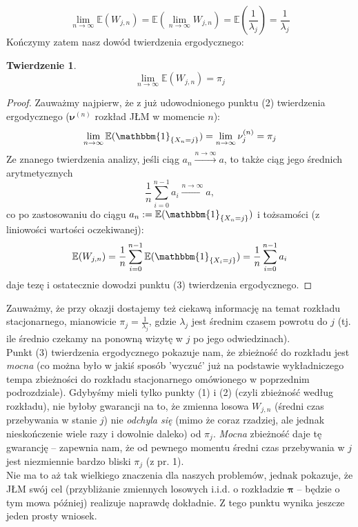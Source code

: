 \documentclass[a4paper]{article}
\theoremstyle{defn}
\theoremstyle{theorem}
\newtheorem{theorem}[defn]{Twierdzenie}
\theoremstyle{lemma}
\theoremstyle{cor}
\theoremstyle{fact}
\begin{document}
$$\lim\limits_{n \to \infty} \mathbb{E}(W_{j,n}) = \mathbb{E}\left( \lim\limits_{n \to \infty} W_{j,n}\right) = \mathbb{E}\left(\frac{1}{\lambda_j}\right) = \frac{1}{\lambda_j}$$
Kończymy zatem nasz dowód twierdzenia ergodycznego:
\begin{theorem}\label{theorem2.5.13}
$$\lim\limits_{n \to \infty} \mathbb{E}(W_{j,n}) = \pi_j$$
\end{theorem}
\begin{proof}
Zauważmy najpierw, że z już udowodnionego punktu (2) twierdzenia ergodycznego ($\boldsymbol{\nu}^{(n)}$ rozkład JŁM w momencie $n$):
$$\lim\limits_{n \to \infty} \mathbb{E}(\mathbbm{1}_{\{X_n = j\}}) = \lim\limits_{n \to \infty} \nu^{(n)}_j = \pi_j$$
Ze znanego twierdzenia analizy, jeśli ciąg $a_n \xrightarrow{n \to \infty} a$, to także ciąg jego średnich arytmetycznych $$\frac{1}{n}\sum_{i=0}^{n-1} a_i \xrightarrow{n \to \infty} a,$$
co po zastosowaniu do ciągu $a_n := \mathbb{E}(\mathbbm{1}_{\{X_n = j\}})$ i tożsamości (z liniowości wartości oczekiwanej):
$$\mathbb{E}(W_{j,n}) = \frac{1}{n} \sum\limits_{i=0}^{n-1} \mathbb{E}(\mathbbm{1}_{\{X_i = j\}}) = \frac{1}{n} \sum\limits_{i=0}^{n-1} a_i$$
daje tezę i ostatecznie dowodzi punktu (3) twierdzenia ergodycznego.
\end{proof}
Zauważmy, że przy okazji dostajemy też ciekawą informację na temat rozkładu stacjonarnego, mianowicie $\pi_j = \frac{1}{\lambda_j}$, gdzie $\lambda_j$ jest średnim czasem powrotu do $j$ (tj. ile średnio czekamy na ponowną wizytę w $j$ po jego odwiedzinach).
\\

Punkt (3) twierdzenia ergodycznego pokazuje nam, że zbieżność do rozkładu jest \textit{mocna} (co można było w jakiś sposób 'wyczuć' już na podstawie wykładniczego tempa zbieżności do rozkładu stacjonarnego omówionego w poprzednim podrozdziale). Gdybyśmy mieli tylko punkty (1) i (2) (czyli zbieżność według rozkładu), nie byłoby gwarancji na to, że zmienna losowa $W_{j,n}$ (średni czas przebywania w stanie $j$) nie \textit{odchyla się} (mimo że coraz rzadziej, ale jednak nieskończenie wiele razy i dowolnie daleko) od $\pi_j$. \textit{Mocna} zbieżność daje tę gwarancję – zapewnia nam, że od pewnego momentu średni czas przebywania w $j$ jest niezmiennie bardzo bliski $\pi_j$ (z pr. 1).\\
Nie ma to aż tak wielkiego znaczenia dla naszych problemów, jednak pokazuje, że JŁM swój cel (przybliżanie zmiennych losowych i.i.d. o rozkładzie $\boldsymbol{\pi}$ – będzie o tym mowa później) realizuje naprawdę dokładnie. Z tego punktu wynika jeszcze jeden prosty wniosek.
\\
\end{document}

